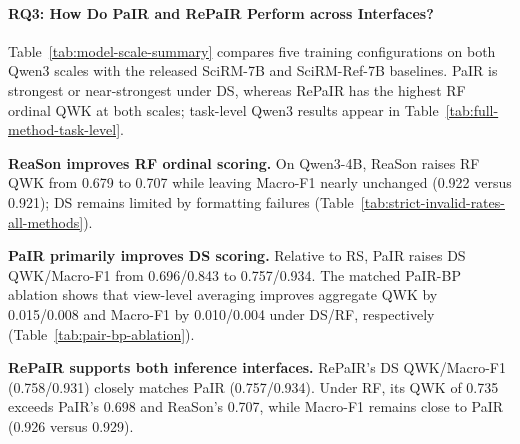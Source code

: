 \paragraph{RQ3: How Do PaIR and RePaIR Perform across Interfaces?}


Table~\ref{tab:model-scale-summary} compares five training configurations
on both Qwen3 scales with the released SciRM-7B and SciRM-Ref-7B baselines.
PaIR is strongest or near-strongest under DS, whereas RePaIR has the highest
RF ordinal QWK at both scales; task-level Qwen3 results appear in
Table~\ref{tab:full-method-task-level}.




\textbf{ReaSon improves RF ordinal scoring.}
On Qwen3-4B, ReaSon raises RF QWK from 0.679 to 0.707 while leaving
Macro-F1 nearly unchanged (0.922 versus 0.921); DS remains limited by
formatting failures (Table~\ref{tab:strict-invalid-rates-all-methods}).


\textbf{PaIR primarily improves DS scoring.}
Relative to RS, PaIR raises DS QWK/Macro-F1 from 0.696/0.843 to
0.757/0.934. The matched PaIR-BP ablation shows that view-level averaging
improves aggregate QWK by 0.015/0.008 and Macro-F1 by 0.010/0.004 under
DS/RF, respectively (Table~\ref{tab:pair-bp-ablation}).



\textbf{RePaIR supports both inference interfaces.}
RePaIR's DS QWK/Macro-F1 (0.758/0.931) closely matches PaIR
(0.757/0.934). Under RF, its QWK of 0.735 exceeds PaIR's 0.698 and
ReaSon's 0.707, while Macro-F1 remains close to PaIR (0.926 versus 0.929).

\flushbottom
